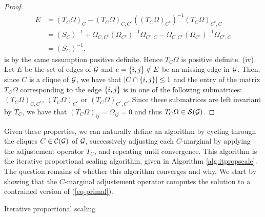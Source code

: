 \begin{proof}
    \begin{align*}
        E &= (T_C \Omega)_C - (T_C \Omega)_{C, C^c}((T_C \Omega)_{C^c})^{-1}(T_C \Omega)_{C^c,C}\\
        &= (S_C)^{-1} + \Omega_{C, C^c}(\Omega_{C^c})^{-1}\Omega_{C^c, C} - \Omega_{C, C^c}(\Omega_{C^c})^{-1}\Omega_{C^c,C}\\
        &= (S_C)^{-1},
    \end{align*}
    is by the same assumption positive definite. Hence $T_C \Omega$ is positive definite.
    \newline
    (iv) Let $E$ be the set of edges of ${\mathcal{G}}$ and $e = {\left\{i, j\right\}} \notin E$ be an missing edge in ${\mathcal{G}}$. Then, since $C$ is a clique of ${\mathcal{G}}$, we have that $|C \cap {\left\{i, j\right\}}| \leq 1$ and the entry of the matrix $T_C \Omega$ corresponding to the edge ${\left\{i, j\right\}}$ is in one of the following submatrices: $(T_C \Omega)_{C, C^c}$, $(T_C \Omega)_{C^c}$ or $(T_C \Omega)_{C^c,C}$. Since these submatrices are left invariant by $T_C$, we have that $(T_C \Omega)_{ij} = \Omega_{ij} = 0$ and thus $T_C \Omega \in {\mathcal{S}}({\mathcal{G}})$.
\end{proof}

Given these properties, we can naturally define an algorithm by cycling through the cliques $C \in {\mathcal{C}}({\mathcal{G}})$ of ${\mathcal{G}}$, successively adjusting each $C$-marginal by applying the adjustement operator $T_C$, and repeating until convergence. This algorithm is the iterative proportional scaling algorithm, given in Algorithm \ref{alg:itpropscale}. The question remains of whether this algorithm converges and why. We start by showing that the $C$-marginal adjustement operator computes the solution to a contrained version of (\ref{eq-primal}).

\begin{algorithm}[ht!]
    \caption{Iterative proportional scaling}
    \label{alg:itpropscale}
    \begin{algorithmic}[1]
    
        \EndFor
        \Else
        \EndIf
    \end{algorithmic}
\end{algorithm}

